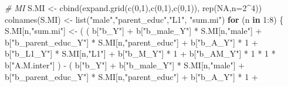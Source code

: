 \documentclass[
]{book}
\newenvironment{Shaded}{\begin{snugshade}}{\end{snugshade}}
\newcommand{\AttributeTok}[1]{\textcolor[rgb]{0.77,0.63,0.00}{#1}}
\newcommand{\CommentTok}[1]{\textcolor[rgb]{0.56,0.35,0.01}{\textit{#1}}}
\newcommand{\ConstantTok}[1]{\textcolor[rgb]{0.00,0.00,0.00}{#1}}
\newcommand{\ControlFlowTok}[1]{\textcolor[rgb]{0.13,0.29,0.53}{\textbf{#1}}}
\newcommand{\DecValTok}[1]{\textcolor[rgb]{0.00,0.00,0.81}{#1}}
\newcommand{\FunctionTok}[1]{\textcolor[rgb]{0.00,0.00,0.00}{#1}}
\newcommand{\NormalTok}[1]{#1}
\newcommand{\OtherTok}[1]{\textcolor[rgb]{0.56,0.35,0.01}{#1}}
\newcommand{\SpecialCharTok}[1]{\textcolor[rgb]{0.00,0.00,0.00}{#1}}
\newcommand{\StringTok}[1]{\textcolor[rgb]{0.31,0.60,0.02}{#1}}
\begin{document}
\begin{Shaded}
\begin{Highlighting}[]
  \CommentTok{\# MI }
\NormalTok{  S.MI }\OtherTok{\textless{}{-}} \FunctionTok{cbind}\NormalTok{(}\FunctionTok{expand.grid}\NormalTok{(}\FunctionTok{c}\NormalTok{(}\DecValTok{0}\NormalTok{,}\DecValTok{1}\NormalTok{),}\FunctionTok{c}\NormalTok{(}\DecValTok{0}\NormalTok{,}\DecValTok{1}\NormalTok{),}\FunctionTok{c}\NormalTok{(}\DecValTok{0}\NormalTok{,}\DecValTok{1}\NormalTok{)), }\FunctionTok{rep}\NormalTok{(}\ConstantTok{NA}\NormalTok{,}\AttributeTok{n=}\DecValTok{2}\SpecialCharTok{\^{}}\DecValTok{4}\NormalTok{))}
  \FunctionTok{colnames}\NormalTok{(S.MI) }\OtherTok{\textless{}{-}} \FunctionTok{list}\NormalTok{(}\StringTok{"male"}\NormalTok{,}\StringTok{"parent\_educ"}\NormalTok{,}\StringTok{"L1"}\NormalTok{, }\StringTok{"sum.mi"}\NormalTok{)}
  \ControlFlowTok{for}\NormalTok{ (n }\ControlFlowTok{in} \DecValTok{1}\SpecialCharTok{:}\DecValTok{8}\NormalTok{) \{}
\NormalTok{    S.MI[n,}\StringTok{"sum.mi"}\NormalTok{] }\OtherTok{\textless{}{-}}\NormalTok{ ( ( b[}\StringTok{"b\_Y"}\NormalTok{] }\SpecialCharTok{+} 
\NormalTok{                              b[}\StringTok{"b\_male\_Y"}\NormalTok{] }\SpecialCharTok{*}\NormalTok{ S.MI[n,}\StringTok{"male"}\NormalTok{] }\SpecialCharTok{+} 
\NormalTok{                              b[}\StringTok{"b\_parent\_educ\_Y"}\NormalTok{] }\SpecialCharTok{*}\NormalTok{ S.MI[n,}\StringTok{"parent\_educ"}\NormalTok{] }\SpecialCharTok{+} 
\NormalTok{                              b[}\StringTok{"b\_A\_Y"}\NormalTok{] }\SpecialCharTok{*} \DecValTok{1} \SpecialCharTok{+} 
\NormalTok{                              b[}\StringTok{"b\_L1\_Y"}\NormalTok{] }\SpecialCharTok{*}\NormalTok{ S.MI[n,}\StringTok{"L1"}\NormalTok{] }\SpecialCharTok{+}
\NormalTok{                              b[}\StringTok{"b\_M\_Y"}\NormalTok{] }\SpecialCharTok{*} \DecValTok{1} \SpecialCharTok{+}
\NormalTok{                              b[}\StringTok{"b\_AM\_Y"}\NormalTok{] }\SpecialCharTok{*} \DecValTok{1} \SpecialCharTok{*} \DecValTok{1} \SpecialCharTok{*}\NormalTok{ b[}\StringTok{"A.M.inter"}\NormalTok{] ) }\SpecialCharTok{{-}} 
\NormalTok{                            ( b[}\StringTok{"b\_Y"}\NormalTok{] }\SpecialCharTok{+} 
\NormalTok{                                b[}\StringTok{"b\_male\_Y"}\NormalTok{] }\SpecialCharTok{*}\NormalTok{ S.MI[n,}\StringTok{"male"}\NormalTok{] }\SpecialCharTok{+} 
\NormalTok{                                b[}\StringTok{"b\_parent\_educ\_Y"}\NormalTok{] }\SpecialCharTok{*}\NormalTok{ S.MI[n,}\StringTok{"parent\_educ"}\NormalTok{] }\SpecialCharTok{+} 
\NormalTok{                                b[}\StringTok{"b\_A\_Y"}\NormalTok{] }\SpecialCharTok{*} \DecValTok{1} \SpecialCharTok{+} 

\end{Highlighting}
\end{Shaded}
\end{document}
